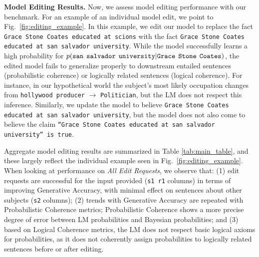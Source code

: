 \documentclass[11pt,a4paper]{article}
\begin{document}
\vspace{4pt}
\noindent \textbf{Model Editing Results.} Now, we assess model editing performance with our benchmark. For an example of an individual model edit, we point to Fig.~\ref{fig:editing_example}. In this example, we edit our model to replace the fact \texttt{Grace Stone Coates educated at scions} with the fact \texttt{Grace Stone Coates educated at san salvador university}. While the model successfully learns a high probability for { \small $p(\texttt{san\hspace{-1pt} salvador \hspace{-1pt}university}|\texttt{Grace\hspace{-1pt} Stone\hspace{-1pt} Coates})$}, the edited model fails to generalize properly to downstream entailed sentences (probabilistic coherence) or logically related sentences (logical coherence). 
For instance, in our hypothetical world the subject's most likely occupation changes from \texttt{hollywood producer} $\rightarrow$ \texttt{Politician}, but the LM does not respect this inference. Similarly, we update the model to believe \texttt{Grace Stone Coates educated at san salvador university}, but the model does not also come to believe the claim \texttt{``Grace Stone Coates educated at san salvador university'' is true}.

Aggregate model editing results are summarized in Table \ref{tab:main_table}, and these largely reflect the individual example seen in Fig.~\ref{fig:editing_example}. When looking at performance on \textit{All Edit Requests}, we observe that: (1) edit requests are successful for the input provided (\texttt{s1 \hspace{-9pt} r1} columns) in terms of improving Generative Accuracy, with minimal effect on sentences about other subjects (\texttt{s2} columns); (2) trends with Generative Accuracy are repeated with Probabilistic Coherence metrics; Probabilistic Coherence shows a more precise degree of error between LM probabilities and Bayesian probabilities; and (3) based on Logical Coherence metrics, the LM does not respect basic logical axioms for probabilities, as it does not coherently assign probabilities to logically related sentences before or after editing.
\end{document}
